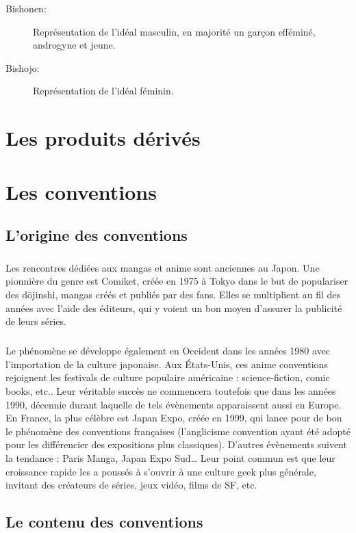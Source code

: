 \begin{description}
	\item[Bishonen:] Représentation de l'idéal masculin, en majorité un garçon
		efféminé, androgyne et jeune.
	\item[Bishojo:] Représentation de l'idéal féminin.
\end{description}

\chapter{Les produits dérivés}

\chapter{Les conventions}
\section{L'origine des conventions}
\paragraph{}
Les rencontres dédiées aux mangas et anime sont anciennes au Japon. Une pionnière du genre est Comiket, créée en 1975 à Tokyo dans le but de populariser des d\=ojinshi, mangas créés et publiés par des fans. Elles se multiplient au fil des années avec l’aide des éditeurs, qui y voient un bon moyen d’assurer la publicité de leurs séries.
\paragraph{}
Le phénomène se développe également en Occident dans les années 1980 avec l’importation de la culture japonaise. Aux États-Unis, ces anime conventions rejoignent les festivals de culture populaire américaine : science-fiction, comic books, etc.. Leur véritable succès ne commencera toutefois que dans les années 1990, décennie durant laquelle de tels évènements apparaissent aussi en Europe. En France, la plus célèbre est Japan Expo, créée en 1999, qui lance pour de bon le phénomène des conventions françaises (l’anglicisme convention ayant été adopté pour les différencier des expositions plus classiques). D’autres évènements suivent la tendance : Paris Manga, Japan Expo Sud… Leur point commun est que leur croissance rapide les a poussés à s’ouvrir à une culture geek plus générale, invitant des créateurs de séries, jeux vidéo, films de SF, etc.

\section{Le contenu des conventions}
